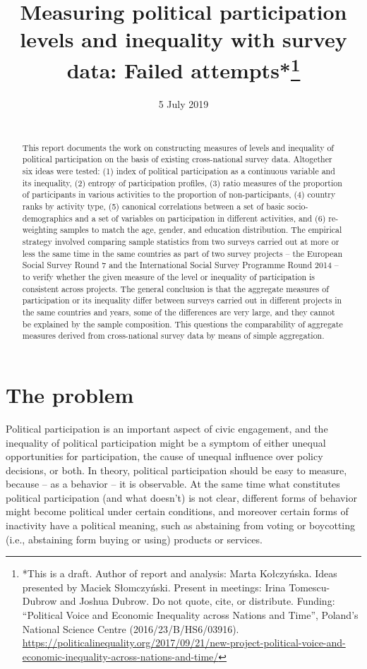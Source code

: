 \documentclass[12pt,]{article}
\title{\vspace{1cm}Measuring political participation levels and inequality with survey data: Failed attempts*\footnote{*This is a draft. Author of report and analysis: Marta Kołczyńska. Ideas presented by Maciek Słomczyński. Present in meetings: Irina Tomescu-Dubrow and Joshua Dubrow. Do not quote, cite, or distribute. Funding: ``Political Voice and Economic Inequality across Nations and Time'', Poland's National Science Centre (2016/23/B/HS6/03916). \url{https://politicalinequality.org/2017/09/21/new-project-political-voice-and-economic-inequality-across-nations-and-time/}}\vspace{0.5cm}\\}
\author{}
\date{5 July 2019\\
~\\}
\begin{document}
\maketitle
\begin{abstract}
\noindent{}This report documents the work on constructing measures of levels and inequality of political participation on the basis of existing cross-national survey data. Altogether six ideas were tested: (1) index of political participation as a continuous variable and its inequality, (2) entropy of participation profiles, (3) ratio measures of the proportion of participants in various activities to the proportion of non-participants, (4) country ranks by activity type, (5) canonical correlations between a set of basic socio-demographics and a set of variables on participation in different activities, and (6) re-weighting samples to match the age, gender, and education distribution. The empirical strategy involved comparing sample statistics from two surveys carried out at more or less the same time in the same countries as part of two survey projects -- the European Social Survey Round 7 and the International Social Survey Programme Round 2014 -- to verify whether the given measure of the level or inequality of participation is consistent across projects. The general conclusion is that the aggregate measures of participation or its inequality differ between surveys carried out in different projects in the same countries and years, some of the differences are very large, and they cannot be explained by the sample composition. This questions the comparability of aggregate measures derived from cross-national survey data by means of simple aggregation. \vspace{.8cm}
\end{abstract}

\clearpage

\renewcommand{\baselinestretch}{0.5}\normalsize
\tableofcontents
\renewcommand{\baselinestretch}{1.1}\normalsize

\clearpage

\hypertarget{the-problem}{%
\section{The problem}\label{the-problem}}

Political participation is an important aspect of civic engagement, and the inequality of political participation might be a symptom of either unequal opportunities for participation, the cause of unequal influence over policy decisions, or both. In theory, political participation should be easy to measure, because -- as a behavior -- it is observable. At the same time what constitutes political participation (and what doesn't) is not clear, different forms of behavior might become political under certain conditions, and moreover certain forms of inactivity have a political meaning, such as abstaining from voting or boycotting (i.e., abstaining form buying or using) products or services.
\end{document}
